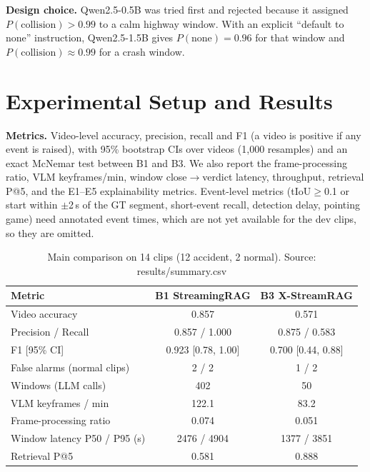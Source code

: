 \documentclass[conference]{IEEEtran}
\begin{document}
\textbf{Design choice.} Qwen2.5-0.5B was tried first and rejected because it assigned
$P(\text{collision})>0.99$ to a calm highway window. With an explicit ``default to none'' instruction,
Qwen2.5-1.5B gives $P(\text{none})=0.96$ for that window and $P(\text{collision})\approx0.99$ for a crash
window.

\section{Experimental Setup and Results}
\textbf{Metrics.} Video-level accuracy, precision, recall and F1 (a video is positive if any event is
raised), with 95\% bootstrap CIs over videos (1,000 resamples) and an exact McNemar test between B1 and
B3. We also report the frame-processing ratio, VLM keyframes/min, window close$\rightarrow$verdict latency,
throughput, retrieval P@5, and the E1--E5 explainability metrics. Event-level metrics (tIoU$\ge$0.1 or start
within $\pm$2\,s of the GT segment, short-event recall, detection delay, pointing game) need annotated
event times, which are not yet available for the dev clips, so they are omitted.

\begin{table}[t]
\caption{Main comparison on 14 clips (12 accident, 2 normal). Source: results/summary.csv}
\label{tab:main}
\centering
\begin{tabular}{lcc}
\toprule
Metric & B1 StreamingRAG & B3 X-StreamRAG \\
\midrule
Video accuracy & 0.857 & 0.571 \\
Precision / Recall & 0.857 / 1.000 & 0.875 / 0.583 \\
F1 [95\% CI] & 0.923 [0.78, 1.00] & 0.700 [0.44, 0.88] \\
False alarms (normal clips) & 2 / 2 & 1 / 2 \\
Windows (LLM calls) & 402 & 50 \\
VLM keyframes / min & 122.1 & 83.2 \\
Frame-processing ratio & 0.074 & 0.051 \\
Window latency P50 / P95 (s) & 2476 / 4904 & 1377 / 3851 \\
Retrieval P@5 & 0.581 & 0.888 \\
\bottomrule
\end{tabular}
\end{table}
\end{document}
